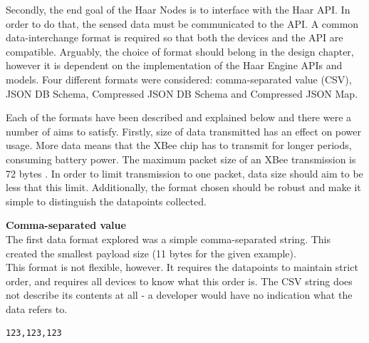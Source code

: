       Secondly, the end goal of the Haar Nodes is to interface with the Haar API. In order to do that, the sensed data must be communicated to the API. A common data-interchange format is required so that both the devices and the API are compatible. Arguably, the choice of format should belong in the design chapter, however it is dependent on the implementation of the Haar Engine APIs and models. Four different formats were considered: comma-separated value (CSV), JSON DB Schema, Compressed JSON DB Schema and Compressed JSON Map.

      Each of the formats have been described and explained below and there were a number of aims to satisfy. Firstly, size of data transmitted has an effect on power usage. More data means that the XBee chip has to transmit for longer periods, consuming battery power. The maximum packet size of an XBee transmission is 72 bytes \citep{xbee-packet-size}. In order to limit transmission to one packet, data size should aim to be less that this limit. Additionally, the format chosen should be robust and make it simple to distinguish the datapoints collected.\\

      \noindent
      \begin{minipage}[t]{0.45\textwidth}
        \textbf{Comma-separated value}\\
        The first data format explored was a simple comma-separated string. This created the smallest payload size (11 bytes for the given example).\\

        This format is not flexible, however. It requires the datapoints to maintain strict order, and requires all devices to know what this order is. The CSV string does not describe its contents at all - a developer would have no indication what the data refers to.\\
      \end{minipage}
      \hfill
      \begin{minipage}[t]{0.45\textwidth}
        \begin{lstlisting}[frame=single]
  123,123,123
        \end{lstlisting}
      \end{minipage}

